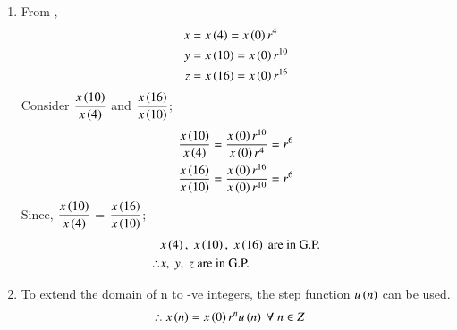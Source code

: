 \documentclass[journal,12pt,twocolumn]{IEEEtran}
\theoremstyle{remark}
\begin{document}
													    \begin{enumerate}
													    \item From ,
													    \begin{align}
													        x&= x\left(4\right) =x\left(0\right)r^4 \\
														 y&=x\left(10\right)=x\left(0\right)r^{10} \\
														  z&=x\left(16\right)=x\left(0\right)r^{16}
														  \end{align}
														  Consider $\dfrac{x\left(10\right)}{x\left(4\right)}$ and $\dfrac{x\left(16\right)}{x\left(10\right)}$;
														  \begin{align}
														   \dfrac{x\left(10\right)}{x\left(4\right)} &= \dfrac{x\left(0\right)r^{10}}{x\left(0\right)r^4} = r^6\\ 
														    \dfrac{x\left(16\right)}{x\left(10\right)} &= \dfrac{x\left(0\right)r^{16}}{x\left(0\right)r^{10}} = r^6
														    \end{align}
														    Since, $\dfrac{x\left(10\right)}{x\left(4\right)}$ = $\dfrac{x\left(16\right)}{x\left(10\right)}$;\\
														    \begin{align}  
														       & x\left(4\right),\; x\left(10\right),\; x\left(16\right)\text{ are in G.P.} \\
														         \therefore & x,\; y,\; z \text{ are in G.P.}
															 \end{align}

															 \item
															 To extend the domain of n to -ve integers, the step function $u\left(n\right)$ can be used.
															 \begin{align}
															 \therefore x\left(n\right) &= x\left(0\right)r^n u\left(n\right) \; \forall \;n\in Z
															 \end{align}


\end{enumerate}
\end{document}
